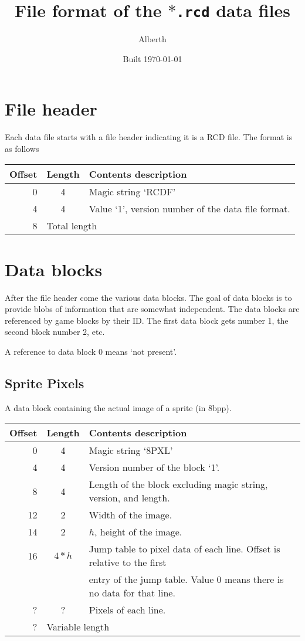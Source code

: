 \documentclass{article}
\title{File format of the \texttt{$*$.rcd} data files}
\author{Alberth}
\date{Built \today}
\begin{document}
\maketitle

\section{File header}
Each data file starts with a file header indicating it is a RCD{} file.
The format is as follows

\begin{center}
\begin{tabular}{|r|c|l|} \hline
\textbf{Offset} & \textbf{Length} & \textbf{Contents description} \\ \hline
0 & 4 & Magic string `RCDF' \\
4 & 4 & Value `1', version number of the data file format. \\ \hline
8 & \multicolumn{2}{l|}{Total length} \\ \hline
\end{tabular}
\end{center}

\section{Data blocks}
After the file header come the various data blocks.
The goal of data blocks is to provide blobs of information that are somewhat independent.
The data blocks are referenced by game blocks by their ID. The first data block
gets number 1, the second block number 2, etc.

A reference to data block 0 means `not present'.


\subsection{Sprite Pixels}
A data block containing the actual image of a sprite (in 8bpp).

\begin{center}
\begin{tabular}{|r|c|l|} \hline
\textbf{Offset} & \textbf{Length} & \textbf{Contents description} \\ \hline
 0 & 4 & Magic string `8PXL' \\
 4 & 4 & Version number of the block `1'. \\
 8 & 4 & Length of the block excluding magic string, version, and length. \\
12 & 2 & Width of the image. \\
14 & 2 & $h$, height of the image. \\
16 & $4*h$ & Jump table to pixel data of each line. Offset is relative to the first \\
   &       & entry of the jump table. Value 0 means there is no data for that line. \\
 ? &    ?  & Pixels of each line. \\ \hline
 ? & \multicolumn{2}{l|}{Variable length} \\ \hline
\end{tabular}
\end{center}
\end{document}
